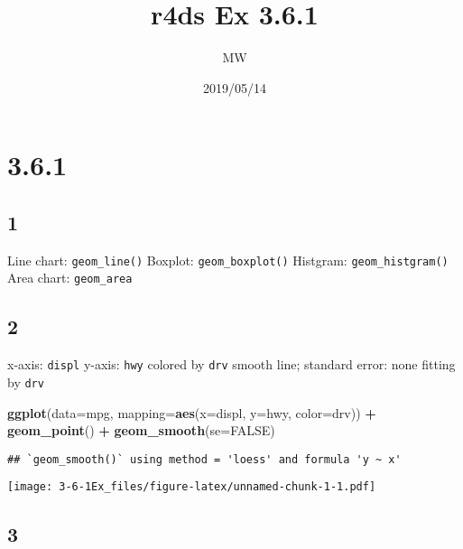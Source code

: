 \documentclass[]{article}
\title{r4ds Ex 3.6.1}
\author{MW}
\date{2019/05/14}
\newenvironment{Shaded}{\begin{snugshade}}{\end{snugshade}}
\newcommand{\DataTypeTok}[1]{\textcolor[rgb]{0.13,0.29,0.53}{#1}}
\newcommand{\KeywordTok}[1]{\textcolor[rgb]{0.13,0.29,0.53}{\textbf{#1}}}
\newcommand{\NormalTok}[1]{#1}
\newcommand{\OperatorTok}[1]{\textcolor[rgb]{0.81,0.36,0.00}{\textbf{#1}}}
\newcommand{\OtherTok}[1]{\textcolor[rgb]{0.56,0.35,0.01}{#1}}
\newcommand{\StringTok}[1]{\textcolor[rgb]{0.31,0.60,0.02}{#1}}
\begin{document}
\maketitle

\hypertarget{section}{%
\section{3.6.1}\label{section}}

\hypertarget{section-1}{%
\subsection{1}\label{section-1}}

Line chart: \texttt{geom\_line()} Boxplot: \texttt{geom\_boxplot()}
Histgram: \texttt{geom\_histgram()} Area chart: \texttt{geom\_area}

\hypertarget{section-2}{%
\subsection{2}\label{section-2}}

x-axis: \texttt{displ} y-axis: \texttt{hwy} colored by \texttt{drv}
smooth line; standard error: none fitting by \texttt{drv}

\begin{Shaded}
\begin{Highlighting}[]
\KeywordTok{ggplot}\NormalTok{(}\DataTypeTok{data=}\NormalTok{mpg, }\DataTypeTok{mapping=}\KeywordTok{aes}\NormalTok{(}\DataTypeTok{x=}\NormalTok{displ, }\DataTypeTok{y=}\NormalTok{hwy, }\DataTypeTok{color=}\NormalTok{drv)) }\OperatorTok{+}\StringTok{ }
\StringTok{    }\KeywordTok{geom_point}\NormalTok{() }\OperatorTok{+}\StringTok{ }
\StringTok{    }\KeywordTok{geom_smooth}\NormalTok{(}\DataTypeTok{se=}\OtherTok{FALSE}\NormalTok{)}
\end{Highlighting}
\end{Shaded}

\begin{verbatim}
## `geom_smooth()` using method = 'loess' and formula 'y ~ x'
\end{verbatim}

\texttt{[image: 3-6-1Ex\_files/figure-latex/unnamed-chunk-1-1.pdf]}

\hypertarget{section-3}{%
\subsection{3}\label{section-3}}
\end{document}
